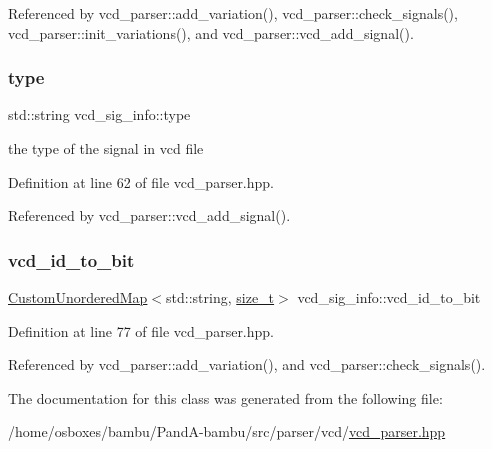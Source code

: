 Referenced by vcd\+\_\+parser\+::add\+\_\+variation(), vcd\+\_\+parser\+::check\+\_\+signals(), vcd\+\_\+parser\+::init\+\_\+variations(), and vcd\+\_\+parser\+::vcd\+\_\+add\+\_\+signal().

\mbox{\label{classvcd__sig__info_aa1ed1c0a54a70f15c91fb481ceb6dd0d}} 
\subsubsection{\texorpdfstring{type}{type}}
{\footnotesize\ttfamily std\+::string vcd\+\_\+sig\+\_\+info\+::type}



the type of the signal in vcd file 



Definition at line 62 of file vcd\+\_\+parser.\+hpp.



Referenced by vcd\+\_\+parser\+::vcd\+\_\+add\+\_\+signal().

\mbox{\label{classvcd__sig__info_a2ec11429997b0aec842b34d1abe14852}} 
\subsubsection{\texorpdfstring{vcd\+\_\+id\+\_\+to\+\_\+bit}{vcd\_id\_to\_bit}}
{\footnotesize\ttfamily \hyperlink{custom__map_8hpp_ad1ed68f2ff093683ab1a33522b144adc}{Custom\+Unordered\+Map}$<$std\+::string, \hyperlink{tutorial__fpt__2017_2intro_2sixth_2test_8c_a7c94ea6f8948649f8d181ae55911eeaf}{size\+\_\+t}$>$ vcd\+\_\+sig\+\_\+info\+::vcd\+\_\+id\+\_\+to\+\_\+bit}



Definition at line 77 of file vcd\+\_\+parser.\+hpp.



Referenced by vcd\+\_\+parser\+::add\+\_\+variation(), and vcd\+\_\+parser\+::check\+\_\+signals().



The documentation for this class was generated from the following file\+:\begin{DoxyCompactItemize}
\item 
/home/osboxes/bambu/\+Pand\+A-\/bambu/src/parser/vcd/\hyperlink{vcd__parser_8hpp}{vcd\+\_\+parser.\+hpp}\end{DoxyCompactItemize}
